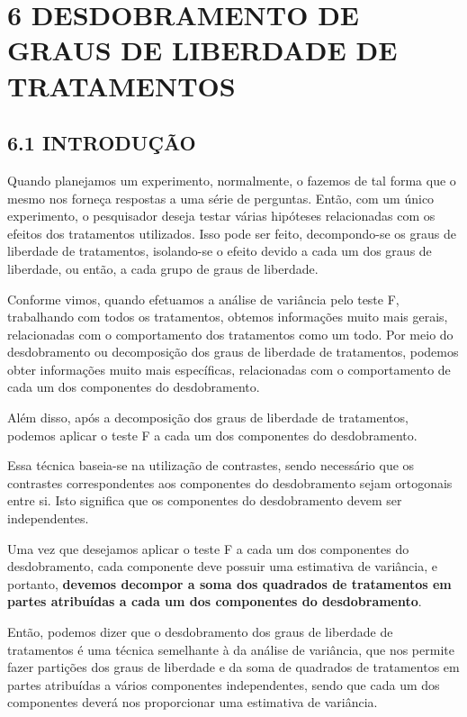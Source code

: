 \documentclass[
]{book}
\begin{document}
\hypertarget{desdobramento-de-graus-de-liberdade-de-tratamentos}{%
\chapter{6 DESDOBRAMENTO DE GRAUS DE LIBERDADE DE TRATAMENTOS}\label{desdobramento-de-graus-de-liberdade-de-tratamentos}}

\hypertarget{introduuxe7uxe3o}{%
\section{6.1 INTRODUÇÃO}\label{introduuxe7uxe3o}}

Quando planejamos um experimento, normalmente, o fazemos de tal forma que o mesmo nos forneça respostas a uma série de perguntas. Então, com um único experimento, o pesquisador deseja testar várias hipóteses relacionadas com os efeitos dos tratamentos utilizados. Isso pode ser feito, decompondo-se os graus de liberdade de tratamentos, isolando-se o efeito devido a cada um dos graus de liberdade, ou então, a cada grupo de graus de liberdade.

Conforme vimos, quando efetuamos a análise de variância pelo teste F, trabalhando com todos os tratamentos, obtemos informações muito mais gerais, relacionadas com o comportamento dos tratamentos como um todo. Por meio do desdobramento ou decomposição dos graus de liberdade de tratamentos, podemos obter informações muito mais específicas, relacionadas com o comportamento de cada um dos componentes do desdobramento.

Além disso, após a decomposição dos graus de liberdade de tratamentos, podemos aplicar o teste F a cada um dos componentes do desdobramento.

Essa técnica baseia-se na utilização de contrastes, sendo necessário que os contrastes correspondentes aos componentes do desdobramento sejam ortogonais entre si. Isto significa que os componentes do desdobramento devem ser independentes.

Uma vez que desejamos aplicar o teste F a cada um dos componentes do desdobramento, cada componente deve possuir uma estimativa de variância, e portanto, \textbf{devemos decompor a soma dos quadrados de tratamentos em partes atribuídas a cada um dos componentes do desdobramento}.

Então, podemos dizer que o desdobramento dos graus de liberdade de tratamentos é uma técnica semelhante à da análise de variância, que nos permite fazer partições dos graus de liberdade e da soma de quadrados de tratamentos em partes atribuídas a vários componentes independentes, sendo que cada um dos componentes deverá nos proporcionar uma estimativa de variância.
\end{document}
